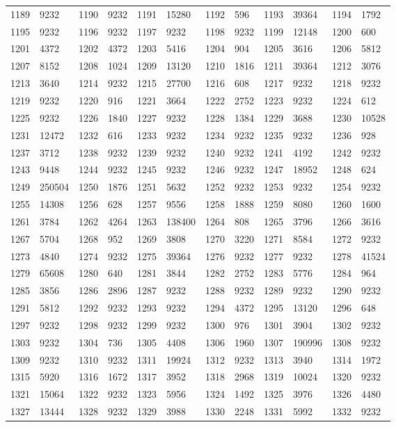 \begin{longtable}{llllllllllll}
1189 & 9232&1190 &9232&1191& 15280&1192 &596&1193 &39364&1194& 1792\\
1195 & 9232&1196 &9232&1197& 9232&1198 &9232&1199 &12148&1200& 600\\
1201 & 4372&1202 &4372&1203& 5416&1204 &904&1205 &3616&1206& 5812\\
1207 & 8152&1208 &1024&1209& 13120&1210 &1816&1211 &39364&1212& 3076\\
1213 & 3640&1214 &9232&1215& 27700&1216 &608&1217 &9232&1218& 9232\\
1219 & 9232&1220 &916&1221& 3664&1222 &2752&1223 &9232&1224& 612\\
1225 & 9232&1226 &1840&1227& 9232&1228 &1384&1229 &3688&1230& 10528\\
1231 & 12472&1232 &616&1233& 9232&1234 &9232&1235 &9232&1236& 928\\
1237 & 3712&1238 &9232&1239& 9232&1240 &9232&1241 &4192&1242& 9232\\
1243 & 9448&1244 &9232&1245& 9232&1246 &9232&1247 &18952&1248& 624\\
1249 & 250504&1250 &1876&1251& 5632&1252 &9232&1253 &9232&1254& 9232\\
1255 & 14308&1256 &628&1257& 9556&1258 &1888&1259 &8080&1260& 1600\\
1261 & 3784&1262 &4264&1263& 138400&1264 &808&1265 &3796&1266& 3616\\
1267 & 5704&1268 &952&1269& 3808&1270 &3220&1271 &8584&1272& 9232\\
1273 & 4840&1274 &9232&1275& 39364&1276 &9232&1277 &9232&1278& 41524\\
1279 & 65608&1280 &640&1281& 3844&1282 &2752&1283 &5776&1284& 964\\
1285 & 3856&1286 &2896&1287& 9232&1288 &9232&1289 &9232&1290& 9232\\
1291 & 5812&1292 &9232&1293& 9232&1294 &4372&1295 &13120&1296& 648\\
1297 & 9232&1298 &9232&1299& 9232&1300 &976&1301 &3904&1302& 9232\\
1303 & 9232&1304 &736&1305& 4408&1306 &1960&1307 &190996&1308& 9232\\
1309 & 9232&1310 &9232&1311& 19924&1312 &9232&1313 &3940&1314& 1972\\
1315 & 5920&1316 &1672&1317& 3952&1318 &2968&1319 &10024&1320& 9232\\
1321 & 15064&1322 &9232&1323& 5956&1324 &1492&1325 &3976&1326& 4480\\
1327 & 13444&1328 &9232&1329& 3988&1330 &2248&1331 &5992&1332& 9232\\

\end{longtable}
